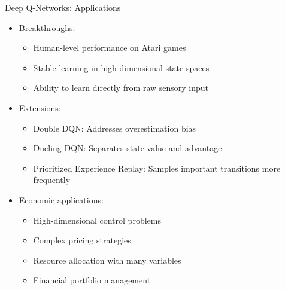 \documentclass[10pt]{beamer}
\begin{document}
\begin{frame}{Deep Q-Networks: Applications}
    \begin{itemize}
        \item Breakthroughs:
        \begin{itemize}
            \item Human-level performance on Atari games
            \item Stable learning in high-dimensional state spaces
            \item Ability to learn directly from raw sensory input
        \end{itemize}
        \vspace{0.2cm}
        \item Extensions:
        \begin{itemize}
            \item Double DQN: Addresses overestimation bias
            \item Dueling DQN: Separates state value and advantage
            \item Prioritized Experience Replay: Samples important transitions more frequently
        \end{itemize}
        \vspace{0.2cm}
        \item Economic applications:
        \begin{itemize}
            \item High-dimensional control problems
            \item Complex pricing strategies
            \item Resource allocation with many variables
            \item Financial portfolio management
        \end{itemize}
    \end{itemize}
\end{frame}

\end{document}
